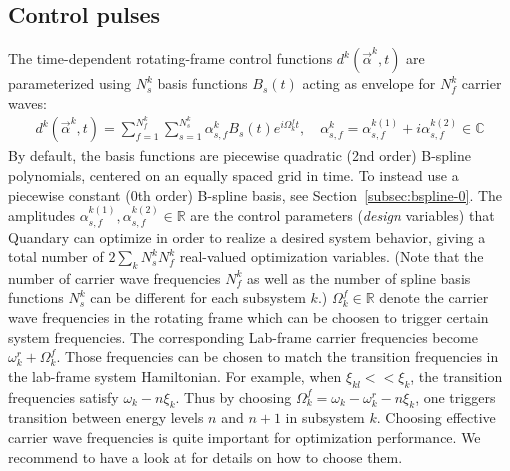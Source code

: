 \documentclass[11pt]{article}
\newcommand{\R}{\mathds{R}}
\newcommand{\C}{\mathds{C}}
\begin{document}
\subsection{Control pulses} \label{subsec:controlpulses}
The time-dependent rotating-frame control functions $d^k(\vec{\alpha}^k,t)$ are parameterized using $N_s^k$ basis functions $B_s(t)$ acting as envelope for $N_f^k$ carrier waves:
\begin{align}\label{eq:spline-ctrl}
  d^k(\vec{\alpha}^k,t) = \sum_{f=1}^{N_f^k} \sum_{s=1}^{N_s^k} \alpha_{s,f}^k B_s(t) e^{i\Omega_k^ft}, \quad \alpha_{s,f}^k = \alpha_{s,f}^{k(1)} + i \alpha_{s,f}^{k(2)} \in \C
\end{align}
By default, the basis functions are piecewise quadratic (2nd order) B-spline polynomials, centered on an equally spaced grid in time. To instead use a piecewise constant (0th order) B-spline basis, see Section~\ref{subsec:bspline-0}.
The amplitudes $\alpha_{s,f}^{k(1)}, \alpha_{s,f}^{k(2)} \in \R$ are the control
parameters (\textit{design} variables) that Quandary can optimize in order to realize a
desired system behavior, giving a total number of $2\sum_kN_s^kN_f^k$ real-valued optimization variables. (Note that the number of carrier wave frequencies $N_f^k$ as well as the number of spline basis functions $N_s^k$ can be different for each subsystem $k$.) $\Omega_k^f \in \R$ denote the carrier wave frequencies in the rotating frame which can be choosen to trigger certain system frequencies. The corresponding Lab-frame carrier frequencies become $\omega_k^r + \Omega_k^f$. Those frequencies can be chosen to match the transition frequencies in the lab-frame system Hamiltonian. For example, when $\xi_{kl} << \xi_k$, the transition frequencies satisfy $\omega_k - n\xi_k$. Thus by choosing $\Omega_k^f = \omega_k-\omega_k^r - n \xi_k$, one triggers transition between energy levels $n$ and $n+1$ in subsystem $k$. Choosing effective carrier wave frequencies is quite important for optimization performance. We recommend to have a look at \cite{petersson2021optimal} for details on how to choose them.
\end{document}
